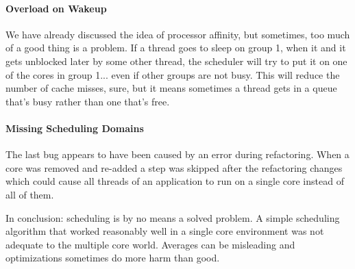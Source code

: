 \paragraph{Overload on Wakeup} We have already discussed the idea of processor affinity, but sometimes, too much of a good thing is a problem. If a thread goes to sleep on group 1, when it and it gets unblocked later by some other thread, the scheduler will try to put it on one of the cores in group 1... even if other groups are not busy. This will reduce the number of cache misses, sure, but it means sometimes a thread gets in a queue that's busy rather than one that's free.

\paragraph{Missing Scheduling Domains}
The last bug appears to have been caused by an error during refactoring. When a core was removed and re-added a step was skipped after the refactoring changes which could cause all threads of an application to run on a single core instead of all of them. 

In conclusion: scheduling is by no means a solved problem. A simple scheduling algorithm that worked reasonably well in a single core environment was not adequate to the multiple core world. Averages can be misleading and optimizations sometimes do more harm than good. 



